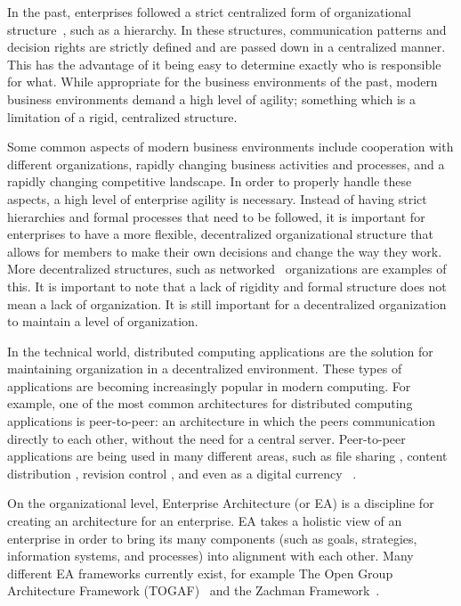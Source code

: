 In the past, enterprises followed a strict centralized form of organizational structure~\cite{pearlson2009}, such as a hierarchy. In these structures, communication patterns and decision rights are strictly defined and are passed down in a centralized manner.  This has the advantage of it being easy to determine exactly who is responsible for what. While appropriate for the business environments of the past, modern business  environments demand a high level of agility; something which is a limitation of a rigid, centralized structure.

Some common aspects of modern business environments include cooperation with different organizations,  rapidly changing business activities and processes, and a rapidly changing competitive landscape. In order to properly handle these aspects, a high level of enterprise agility is necessary. Instead of having strict hierarchies and formal processes that need to be followed, it is important for enterprises to have a more flexible, decentralized organizational structure that allows for members to make their own decisions and change the way they work. More decentralized structures, such as networked~\cite{pearlson2009} organizations are examples of this. It is important to note that a lack of rigidity and formal structure does not mean a lack of organization. It is still important for a decentralized organization to maintain a level of organization.

In the technical world, distributed computing applications are the solution for maintaining organization in a decentralized environment. These types of applications are becoming increasingly popular in modern computing. For example, one of the most common architectures for distributed computing applications is peer-to-peer: an architecture in which the peers communication directly to each other, without the need for a central server. Peer-to-peer applications are being used in many different areas, such as file sharing \cite{bittorrent}, content distribution \cite{blizzard}, revision control \cite{progit}, and even as a digital currency ~\cite{bitcoin2008}.

On the organizational level, Enterprise Architecture (or EA) is a discipline for creating an architecture for an enterprise. EA takes a holistic view of an enterprise in order to bring its many components (such as goals, strategies, information systems, and processes) into alignment with each other. Many different EA frameworks currently exist, for example The Open Group Architecture Framework (TOGAF)~\cite{togaf9.1} and the Zachman Framework~\cite{zachman}. 

